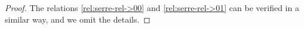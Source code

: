 \documentclass[12pt,reqno]{amsart}
\numberwithin{equation}{section}
\newcommand{\Hom}{\operatorname{Hom}\nolimits}
\begin{document}
\begin{proof}
		The relations \eqref{rel:serre-rel->00} and \eqref{rel:serre-rel->01} can be verified in a similar way, and we omit the details.
		

\end{proof}
\end{document}
